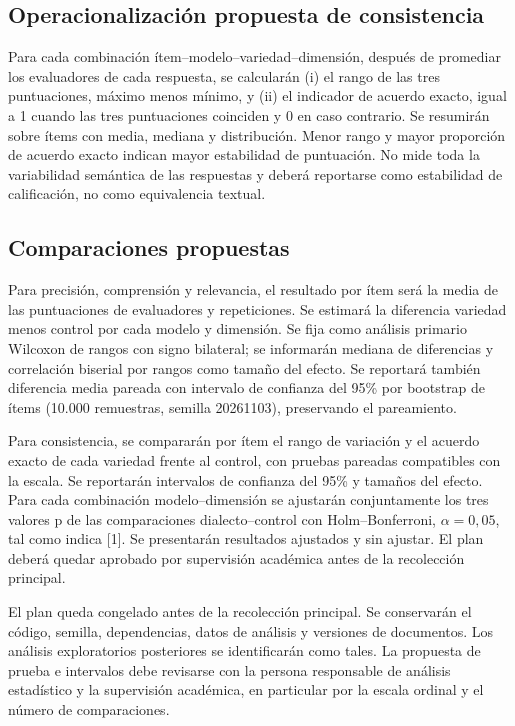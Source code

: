 \documentclass[conference]{IEEEtran}
\begin{document}
\subsection{Operacionalización propuesta de consistencia}
Para cada combinación ítem--modelo--variedad--dimensión, después de promediar los evaluadores de cada respuesta, se calcularán (i) el rango de las tres puntuaciones, máximo menos mínimo, y (ii) el indicador de acuerdo exacto, igual a 1 cuando las tres puntuaciones coinciden y 0 en caso contrario. Se resumirán sobre ítems con media, mediana y distribución. Menor rango y mayor proporción de acuerdo exacto indican mayor estabilidad de puntuación. No mide toda la variabilidad semántica de las respuestas y deberá reportarse como estabilidad de calificación, no como equivalencia textual.

\subsection{Comparaciones propuestas}
Para precisión, comprensión y relevancia, el resultado por ítem será la media de las puntuaciones de evaluadores y repeticiones. Se estimará la diferencia variedad menos control por cada modelo y dimensión. Se fija como análisis primario Wilcoxon de rangos con signo bilateral; se informarán mediana de diferencias y correlación biserial por rangos como tamaño del efecto. Se reportará también diferencia media pareada con intervalo de confianza del 95\% por bootstrap de ítems (10.000 remuestras, semilla 20261103), preservando el pareamiento.

Para consistencia, se compararán por ítem el rango de variación y el acuerdo exacto de cada variedad frente al control, con pruebas pareadas compatibles con la escala. Se reportarán intervalos de confianza del 95\% y tamaños del efecto. Para cada combinación modelo--dimensión se ajustarán conjuntamente los tres valores p de las comparaciones dialecto--control con Holm--Bonferroni, $\alpha=0{,}05$, tal como indica [1]. Se presentarán resultados ajustados y sin ajustar. El plan deberá quedar aprobado por supervisión académica antes de la recolección principal.

El plan queda congelado antes de la recolección principal. Se conservarán el código, semilla, dependencias, datos de análisis y versiones de documentos. Los análisis exploratorios posteriores se identificarán como tales. La propuesta de prueba e intervalos debe revisarse con la persona responsable de análisis estadístico y la supervisión académica, en particular por la escala ordinal y el número de comparaciones.
\end{document}
